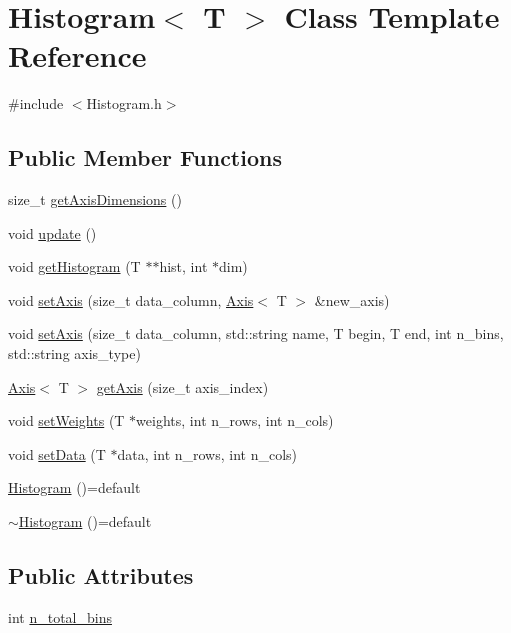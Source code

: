 \hypertarget{class_histogram}{}\section{Histogram$<$ T $>$ Class Template Reference}
\label{class_histogram}


{\ttfamily \#include $<$Histogram.\+h$>$}

\subsection*{Public Member Functions}
\begin{DoxyCompactItemize}
\item 
size\+\_\+t \hyperlink{class_histogram_a7637302e53db8b91576304f663ecc932}{get\+Axis\+Dimensions} ()
\item 
void \hyperlink{class_histogram_aab5a07cfc09bfc0d504d58fbd8164ce3}{update} ()
\item 
void \hyperlink{class_histogram_ae74962acd836b01d1178b83d9aa99550}{get\+Histogram} (T $\ast$$\ast$hist, int $\ast$dim)
\item 
void \hyperlink{class_histogram_a23cf33ed2f5c3d0833d32c7dd0209370}{set\+Axis} (size\+\_\+t data\+\_\+column, \hyperlink{class_axis}{Axis}$<$ T $>$ \&new\+\_\+axis)
\item 
void \hyperlink{class_histogram_abb5b7f6edba2b9a99b6c456c23383d87}{set\+Axis} (size\+\_\+t data\+\_\+column, std\+::string name, T begin, T end, int n\+\_\+bins, std\+::string axis\+\_\+type)
\item 
\hyperlink{class_axis}{Axis}$<$ T $>$ \hyperlink{class_histogram_a07d57444fc60e412e79137af9d87f0ff}{get\+Axis} (size\+\_\+t axis\+\_\+index)
\item 
void \hyperlink{class_histogram_a383443d35829da535f3c049b002928ca}{set\+Weights} (T $\ast$weights, int n\+\_\+rows, int n\+\_\+cols)
\item 
void \hyperlink{class_histogram_a991af624b61ad77f0ecab2697565884b}{set\+Data} (T $\ast$data, int n\+\_\+rows, int n\+\_\+cols)
\item 
\hyperlink{class_histogram_a28ba263b97aefe4da4c30acfe430bede}{Histogram} ()=default
\item 
\hyperlink{class_histogram_aa7885c184150b162950bf75408dafb33}{$\sim$\+Histogram} ()=default
\end{DoxyCompactItemize}
\subsection*{Public Attributes}
\begin{DoxyCompactItemize}
\item 
int \hyperlink{class_histogram_aa390028b7e8a06918cfea6b30506d803}{n\+\_\+total\+\_\+bins}
\end{DoxyCompactItemize}


